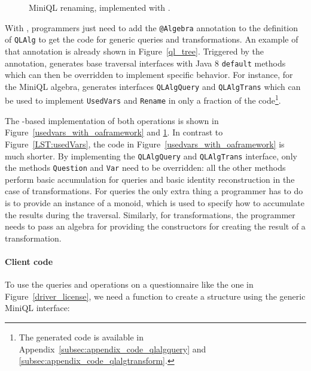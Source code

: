 \begin{figure}
\nocaptionrule
\caption{MiniQL renaming, implemented with  \Name.}
\label{rename_with_oaframework}
\end{figure}

With \Name, programmers just need to add the \lstinline{@Algebra} annotation
to the definition of \lstinline{QLAlg} to get the code for generic
queries and transformations. An example of that annotation is already
shown in Figure~\ref{ql_tree}.
Triggered by the annotation, \name generates base traversal interfaces with Java 8 \lstinline{default} methods which can then be overridden to implement specific behavior.
For instance, for the MiniQL algebra, \name generates interfaces
\lstinline{QLAlgQuery} and
\lstinline{QLAlgTrans} which can be used to implement \lstinline{UsedVars} and \lstinline{Rename} in only a fraction of the code\footnote{The generated code is available in Appendix~\ref{subsec:appendix_code_qlalgquery} and \ref{subsec:appendix_code_qlalgtransform}.}.

The \name-based implementation of both operations is shown in
Figure~\ref{usedvars_with_oaframework} and
\ref{rename_with_oaframework}. In contrast to Figure~\ref{LST:usedVars}, the
code in Figure~\ref{usedvars_with_oaframework} is much shorter.
By implementing the
\lstinline{QLAlgQuery} and \lstinline{QLAlgTrans} interface, only the
methods \lstinline{Question} and \lstinline{Var} need to be
overridden: all the other methods perform basic accumulation for
queries and basic identity reconstruction in the case of
transformations.  For queries the only extra thing a programmer
has to do is to provide an instance of a monoid, which is used to
specify how to accumulate the results during the traversal. Similarly,
for transformations, the programmer needs to pass an algebra for
providing the constructors for creating the result of a
transformation.

\paragraph{Client code}
To use the queries and operations on a questionnaire like the one in Figure~\ref{driver_license}, we need a function to create a structure using the generic MiniQL interface:


